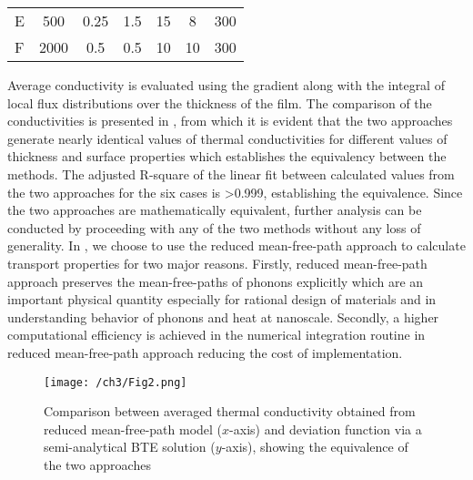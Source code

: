 \begin{table}[hbt]
{\begin{tabular}{lcccccc}
E       & 500            & 0.25                                                                   & 1.5                                                                    & 15             & 8              & 300             \\
F       & 2000           & 0.5                                                                    & 0.5                                                                    & 10             & 10             & 300             \\
\bottomrule[\heavyrulewidth]
\end{tabular}
}
\label{tab:parameters-validation}
\end{table}

Average conductivity is evaluated using the gradient along with the integral of local flux distributions over the thickness of the film. The comparison of the conductivities is presented in , from which it is evident that the two approaches generate nearly identical values of thermal conductivities for different values of thickness and surface properties which establishes the equivalency between the methods. The adjusted R-square of the linear fit between calculated values from the two approaches for the six cases is \textgreater 0.999, establishing the equivalence. Since the two approaches are mathematically equivalent, further analysis can be conducted by proceeding with any of the two methods without any loss of generality. In , we choose to use the reduced mean-free-path approach to calculate transport properties for two major reasons. Firstly, reduced mean-free-path approach preserves the mean-free-paths of phonons explicitly which are an important physical quantity especially for rational design of materials and in understanding behavior of phonons and heat at nanoscale. Secondly, a higher computational efficiency is achieved in the numerical integration routine in reduced mean-free-path approach reducing the cost of implementation.
\begin{figure}[hbt]
	\centering\texttt{[image: /ch3/Fig2.png]}
	\caption{Comparison between averaged thermal conductivity obtained from reduced mean-free-path model ($x$-axis) and deviation function via a semi-analytical BTE solution ($y$-axis), showing the equivalence of the two approaches}
	\label{fig:ch3-validation}
\end{figure}

